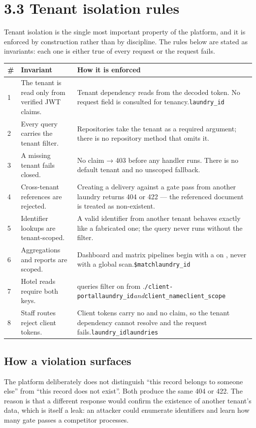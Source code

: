 \documentclass[11pt,a4paper,oneside]{book}
\begin{document}
\section{3.3 Tenant isolation rules}
Tenant isolation is the single most important property of the platform, and it is enforced by construction rather than by discipline. The rules below are stated as invariants: each one is either true of every request or the request fails.

\begin{center}\small
\begin{tabularx}{\linewidth}{|X|X|X|}
\hline
\rowcolor{lightgrey}
\textbf{\#} & \textbf{Invariant} & \textbf{How it is enforced} \\ \hline
1 & The tenant is read only from verified JWT claims. & Tenant dependency reads  from the decoded token. No request field is consulted for tenancy.\texttt{laundry\_id} \\ \hline
2 & Every query carries the tenant filter. & Repositories take the tenant as a required argument; there is no repository method that omits it. \\ \hline
3 & A missing tenant fails closed. & No claim → 403 before any handler runs. There is no default tenant and no unscoped fallback. \\ \hline
4 & Cross-tenant references are rejected. & Creating a delivery against a gate pass from another laundry returns 404 or 422 — the referenced document is treated as non-existent. \\ \hline
5 & Identifier lookups are tenant-scoped. & A valid identifier from another tenant behaves exactly like a fabricated one; the query never runs without the filter. \\ \hline
6 & Aggregations and reports are scoped. & Dashboard and matrix pipelines begin with a  on , never with a global scan.\texttt{\$match}\texttt{laundry\_id} \\ \hline
7 & Hotel reads require both keys. & queries filter on    from .\texttt{/client-portal}\texttt{laundry\_id}\emph{and}\texttt{client\_name}\texttt{client\_scope} \\ \hline
8 & Staff routes reject client tokens. & Client tokens carry no  and no  claim, so the tenant dependency cannot resolve and the request fails.\texttt{laundry\_id}\texttt{laundries} \\ \hline
\end{tabularx}
\end{center}
\subsection*{How a violation surfaces}
The platform deliberately does not distinguish “this record belongs to someone else” from “this record does not exist”. Both produce the same 404 or 422. The reason is that a different response would confirm the existence of another tenant's data, which is itself a leak: an attacker could enumerate identifiers and learn how many gate passes a competitor processes.
\end{document}
